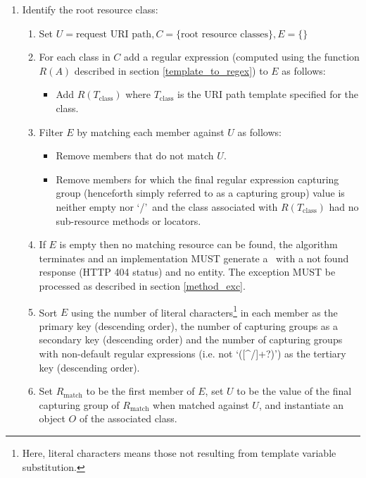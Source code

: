 \begin{enumerate}
\item Identify the root resource class:

\begin{enumerate}
\item Set $U=\mbox{request URI path}, C=\{\mbox{root resource classes}\}, E=\{\}$

\item For each class in $C$ add a regular expression (computed using the function $R(A)$ described in section \ref{template_to_regex}) to $E$ as follows:
\begin{itemize}
\item Add $R(T_{\mbox{class}})$ where $T_{\mbox{class}}$ is the URI path template specified for the class.
\end{itemize}

\item Filter $E$ by matching each member against $U$ as follows:
\begin{itemize}
\item Remove members that do not match $U$.
\item Remove members for which the final regular expression capturing group (henceforth simply referred to as a capturing group) value is neither empty nor \lq/\rq\ and the class associated with $R(T_{\mbox{class}})$ had no sub-resource methods or locators.
\end{itemize}

\item If $E$ is empty then no matching resource can be found, the algorithm terminates and an implementation MUST generate a \WebAppExc\ with a not found response (HTTP 404 status) and no entity. The exception MUST be processed as described in section \ref{method_exc}.

\item Sort $E$ using the number of literal characters\footnote{Here, literal characters means those not resulting from template variable substitution.} in each member as the primary key (descending order), the number of capturing groups as a secondary key (descending order) and the number of capturing groups with non-default regular expressions (i.e. not \lq([\^{ }/]+?)\rq) as the tertiary key (descending order).

\item Set $R_{\mbox{match}}$ to be the first member of $E$, set $U$ to be the value of the final capturing group of $R_{\mbox{match}}$ when matched against $U$, and instantiate an object $O$ of the associated class.


\end{enumerate}
\end{enumerate}
